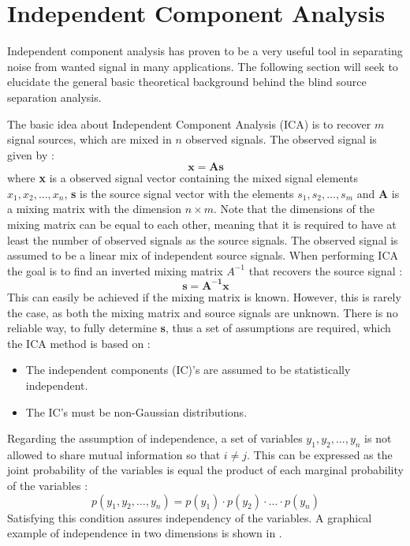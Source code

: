 
\section{Independent Component Analysis} \label{sec:ICA}
Independent component analysis has proven to be a very useful tool in separating noise from wanted signal in many applications. The following section will seek to elucidate the general basic theoretical background behind the blind source separation analysis.  

The basic idea about Independent Component Analysis (ICA) is to recover $m$ signal sources, which are mixed in $n$ observed signals. The observed signal is given by \cite{Hyvarinen2001}:
\begin{equation}
\mathbf{x} = \mathbf{A}\mathbf{s}
\end{equation}
where \textbf{x} is a observed signal vector containing the mixed signal elements $x_1, x_2, ..., x_n$, \textbf{s} is the source signal vector with the elements $s_1, s_2, ..., s_m$ and $\mathbf{A}$ is a mixing matrix with the dimension $n \times m$. Note that the dimensions of the mixing matrix can be equal to each other, meaning that it is required to have at least the number of observed signals as the source signals. The observed signal is assumed to be a linear mix of independent source signals. When performing ICA the goal is to find an inverted mixing matrix \textbf{$A^{-1}$} that recovers the source signal \cite{Hyvarinen2001}:
\begin{equation}
\mathbf{s} = \mathbf{A^{-1}}\mathbf{x}
\end{equation}
This can easily be achieved if the mixing matrix is known. However, this is rarely the case, as both the mixing matrix and source signals are unknown. There is no reliable way, to fully determine \textbf{s}, thus a set of assumptions are required, which the ICA method is based on \cite{Hyvarinen2001}:
\begin{itemize}
	\item The independent components (IC)’s are assumed to be statistically independent.
	\item The IC’s must be non-Gaussian distributions.
\end{itemize}
Regarding the assumption of independence, a set of variables $y_1, y_2, ..., y_n$ is not allowed to share mutual information so that $i \neq j$. This can be expressed as the joint probability of the variables is equal the product of each marginal probability of the variables \cite{Hyvarinen2001}:
\begin{equation}
p(y_1, y_2, …, y_n) = p(y_1) \cdot p(y_2) \cdot ... \cdot p(y_n) 
\end{equation} \label{eq:independence}
Satisfying this condition assures independency of the variables. A graphical example of independence in two dimensions is shown in  \cite{Hyvarinen2001, Hyvarinen2000}. 

